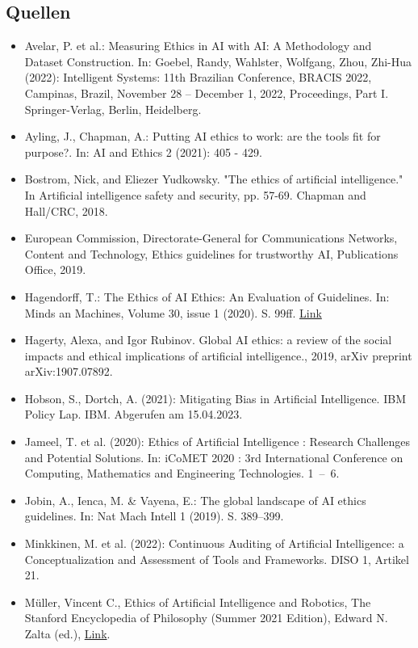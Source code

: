 \subsection{Quellen}

\begin{itemize}
\item Avelar, P. et al.: Measuring Ethics in AI with AI: A Methodology and Dataset Construction. In: Goebel, Randy, Wahlster, Wolfgang, Zhou, Zhi-Hua (2022): Intelligent Systems: 11th Brazilian Conference, BRACIS 2022, Campinas, Brazil, November 28 – December 1, 2022, Proceedings, Part I. Springer-Verlag, Berlin, Heidelberg.
\item Ayling, J., Chapman, A.: Putting AI ethics to work: are the tools fit for purpose?. In: AI and Ethics 2 (2021): 405 - 429.
\item Bostrom, Nick, and Eliezer Yudkowsky. "The ethics of artificial intelligence." In Artificial intelligence safety and security, pp. 57-69. Chapman and Hall/CRC, 2018.
\item European Commission, Directorate-General for Communications Networks, Content and Technology, Ethics guidelines for trustworthy AI, Publications Office, 2019.
\item Hagendorff, T.: The Ethics of AI Ethics: An Evaluation of Guidelines. In: Minds an Machines, Volume 30, issue 1 (2020). S. 99ff. \href{https://link.springer.com/content/pdf/10.1007/s11023-020-09517-8.pdf}{Link}
\item Hagerty, Alexa, and Igor Rubinov. Global AI ethics: a review of the social impacts and ethical implications of artificial intelligence.,  2019, arXiv preprint arXiv:1907.07892.
\item Hobson, S., Dortch, A. (2021): Mitigating Bias in Artificial Intelligence. IBM Policy Lap. IBM. Abgerufen am 15.04.2023.
\item Jameel, T. et al. (2020): Ethics of Artificial Intelligence : Research Challenges and Potential Solutions. In: iCoMET 2020 : 3rd International Conference on Computing, Mathematics and Engineering Technologies. 1 – 6.
\item Jobin, A., Ienca, M. \& Vayena, E.: The global landscape of AI ethics guidelines. In: Nat Mach Intell 1 (2019). S. 389–399.
\item Minkkinen, M. et al. (2022): Continuous Auditing of Artificial Intelligence: a Conceptualization and Assessment of Tools and Frameworks. DISO 1, Artikel 21.
\item Müller, Vincent C., Ethics of Artificial Intelligence and Robotics, The Stanford Encyclopedia of Philosophy (Summer 2021 Edition), Edward N. Zalta (ed.), \href{https://plato.stanford.edu/archives/sum2021/entries/ethics-ai/}{Link}.

\end{itemize}
